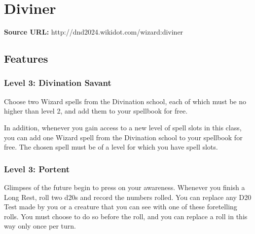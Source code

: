 \documentclass{article}
\begin{document}

\section*{ Diviner }

\textbf{Source URL:} http://dnd2024.wikidot.com/wizard:diviner

\vspace{1em}







\subsection*{Features}

\subsubsection*{ Level 3: Divination Savant }

Choose two Wizard spells from the Divination school, each of which must be no higher than level 2, and add them to your spellbook for free.

In addition, whenever you gain access to a new level of spell slots in this class, you can add one Wizard spell from the Divination school to your spellbook for free. The chosen spell must be of a level for which you have spell slots.

\vspace{1em}

\subsubsection*{ Level 3: Portent }

Glimpses of the future begin to press on your awareness. Whenever you finish a Long Rest, roll two d20s and record the numbers rolled. You can replace any D20 Test made by you or a creature that you can see with one of these foretelling rolls. You must choose to do so before the roll, and you can replace a roll in this way only once per turn.
\end{document}
